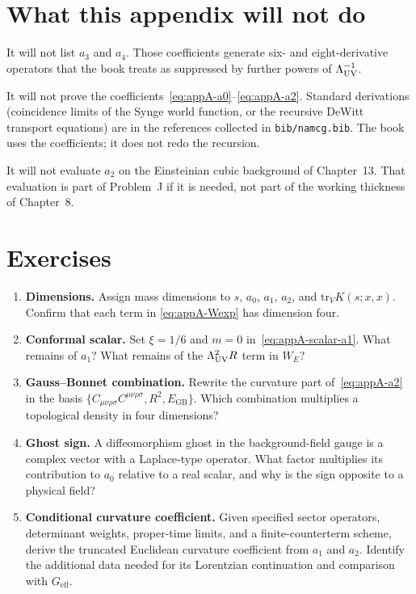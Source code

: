 \section{What this appendix will not do}
\label{sec:appA-not}

It will not list \(a_3\) and \(a_4\). Those coefficients generate
six- and eight-derivative operators that the book treats as
suppressed by further powers of \(\Lambda_{\mathrm{UV}}^{-1}\).

It will not prove the coefficients~\eqref{eq:appA-a0}--\eqref{eq:appA-a2}.
Standard derivations (coincidence limits of the Synge world
function, or the recursive DeWitt transport equations) are in the
references collected in \texttt{bib/namcg.bib}. The book uses the
coefficients; it does not redo the recursion.

It will not evaluate \(a_2\) on the Einsteinian cubic background
of Chapter~13. That evaluation is part of Problem~J if it is
needed, not part of the working thickness of Chapter~8.

\section{Exercises}
\label{sec:appA-exercises}

\begin{enumerate}
  \item \textbf{Dimensions.}
    Assign mass dimensions to \(s\), \(a_0\), \(a_1\), \(a_2\),
    and \(\mathrm{tr}_V K(s;x,x)\). Confirm that each term in
    \eqref{eq:appA-Wexp} has dimension four.
  \item \textbf{Conformal scalar.}
    Set \(\xi=1/6\) and \(m=0\) in~\eqref{eq:appA-scalar-a1}.
    What remains of \(a_1\)? What remains of the \(\Lambda_{\mathrm{UV}}^2 R\)
    term in \(W_E\)?
  \item \textbf{Gauss--Bonnet combination.}
    Rewrite the curvature part of~\eqref{eq:appA-a2} in the
    basis \(\{C_{\mu\nu\rho\sigma}C^{\mu\nu\rho\sigma},R^2,
    E_{\mathrm{GB}}\}\). Which combination multiplies a
    topological density in four dimensions?
  \item \textbf{Ghost sign.}
    A diffeomorphism ghost in the background-field gauge is a
    complex vector with a Laplace-type operator. What factor
    multiplies its contribution to \(a_0\) relative to a real
    scalar, and why is the sign opposite to a physical field?
  \item \textbf{Conditional curvature coefficient.}
    Given specified sector operators, determinant weights, proper-time
    limits, and a finite-counterterm scheme, derive the truncated
    Euclidean curvature coefficient from \(a_1\) and \(a_2\). Identify
    the additional data needed for its Lorentzian continuation and
    comparison with \(G_{\mathrm{eff}}\).
\end{enumerate}